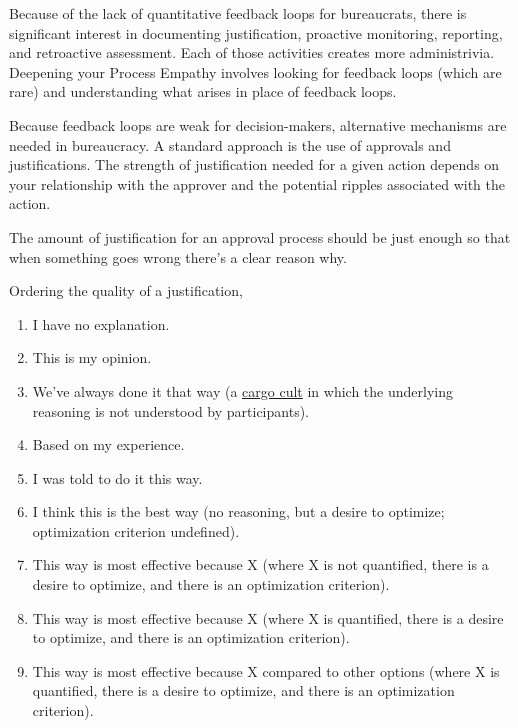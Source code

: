 Because of the lack of quantitative feedback loops for bureaucrats, there is significant interest in documenting justification, proactive monitoring, reporting, and retroactive assessment. Each of those activities creates more administrivia. Deepening your Process Empathy involves looking for feedback loops (which are rare) and understanding what arises in place of feedback loops.


Because feedback loops are weak for decision-makers, alternative mechanisms are needed in bureaucracy. A standard approach is the use of approvals and justifications. The strength of justification needed for a given action depends on your relationship with the approver and the potential ripples associated with the action. 

The amount of justification for an approval process should be just enough so that when something goes wrong there's a clear reason why. 

Ordering the quality of a justification,
\begin{enumerate}
    \item I have no explanation.
    \item This is my opinion.
    \item We've always done it that way (a \href{https://en.wikipedia.org/wiki/Cargo_cult}{cargo cult} in which the underlying reasoning is not understood by participants).
    \iftoggle{WPinmargin}{\marginpar{$>$Wikipedia: Cargo cult}}{}
    \item Based on my experience.
    \item I was told to do it this way.
    \item I think this is the best way (no reasoning, but a desire to optimize; optimization criterion undefined).
    \item This way is most effective because X (where X is not quantified, there is a desire to optimize, and there is an optimization criterion).
    \item This way is most effective because X (where X is quantified, there is a desire to optimize, and there is an optimization criterion).
    \item This way is most effective because X compared to other options (where X is quantified, there is a desire to optimize, and there is an optimization criterion).
\end{enumerate}


